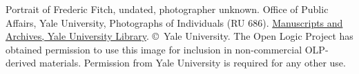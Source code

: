 Portrait of Frederic Fitch, undated, photographer unknown. Office of
Public Affairs, Yale University, Photographs of Individuals (RU
686). \href{http://web.library.yale.edu/mssa}{Manuscripts and
Archives, Yale University Library}. \copyright{}~Yale University. The
Open Logic Project has obtained permission to use this image for
inclusion in non-commercial OLP-derived materials. Permission from
Yale University is required for any other use.
